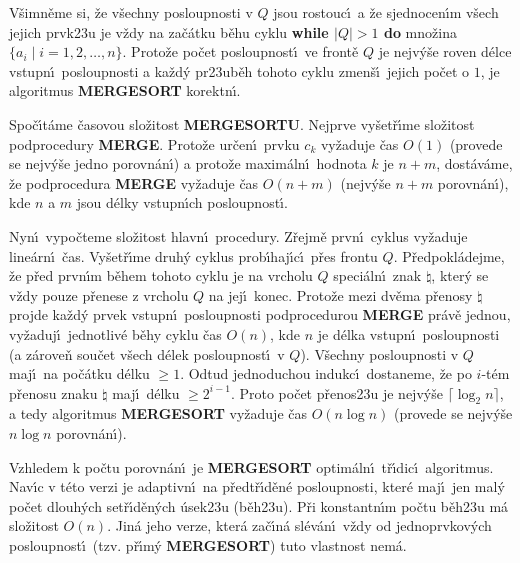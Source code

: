 \flushpar V\v simn\v eme si, \v ze v\v sechny posloupnosti v $Q$ jsou 
rostouc\'\i\ a \v ze sjednocen\'\i m v\v sech jejich prvk\accent23u  
je v\v zdy na za\v c\'atku b\v ehu cyklu {\bf while 
$|Q|>1$ do} mno\v zina $\{a_i\mid i=1,2,\dots,n\}$. 
Proto\v ze po\v cet 
posloupnost\'\i\ ve front\v e $Q$ je nejv\'y\v se roven d\'elce vstupn\'\i\ 
posloupnosti a ka\v zd\'y pr\accent23ub\v eh tohoto 
cyklu zmen\v s\'\i\ jejich po\v cet o $1$, je algoritmus {\bf MERGE\-SORT} korektn\'\i .
\medskip

\flushpar Spo\v c\'\i t\'ame \v casovou slo\v zitost {\bf MERGESORTU}. 
Nejprve vy\v set\v r\'\i me slo\-\v zi\-tost podprocedury {\bf MER\-GE}. Proto\v ze 
ur\v cen\'\i\ prvku $c_k$ vy\v za\-du\-je \v cas $O(1)$ (provede se 
nejv\'y\v se jedno porovn\'an\'\i ) a 
proto\v ze maxim\'aln\'\i\ hodnota $k$ je $n+m$, dost\'av\'ame, \v ze 
podprocedura {\bf MERGE} vy\v zaduje \v cas $O(n+m)$ (nejv\'y\v se $
n+m$ 
porovn\'an\'\i ), kde $n$ a $m$ jsou d\'elky vstupn\'\i ch posloupnost\'\i .
\medskip

\flushpar Nyn\'\i\ vypo\v cteme slo\v zitost hlavn\'\i\ procedury. 
Z\v rejm\v e prvn\'\i\ cyklus vy\v zaduje line\'arn\'\i\ \v cas. Vy\v set\v r\'\i me 
druh\'y cyklus prob\'\i haj\'\i c\'\i\ p\v res frontu $Q$. P\v redpokl\'adejme, \v ze p\v red prvn\'\i m b\v ehem 
tohoto cyklu je na vrcholu $Q$ speci\'aln\'\i\ znak $\natural$, kter\'y se v\v zdy 
pouze p\v renese z vrcholu $Q$ na jej\'\i\ konec. Proto\v ze mezi dv\v ema 
p\v renosy $\natural$ projde ka\v zd\'y prvek vstupn\'\i\ posloupnosti 
podprocedurou {\bf MERGE} pr\'av\v e jednou, vy\v zaduj\'\i\ jednotliv\'e b\v ehy cyklu 
\v cas $O(n)$, kde 
$n$ je d\'elka vstupn\'\i\ posloupnosti (a z\'arove\v n sou\v cet v\v sech d\'elek 
posloupnost\'\i\ v $Q$). V\v sech\-ny posloupnosti v $Q$ maj\'\i\  
na po\v c\'atku d\'elku $\ge 1$. Odtud jednoduchou indukc\'\i\ 
dostaneme, \v ze po $i$-t\'em p\v renosu znaku $\natural$ maj\'\i\ 
d\'elku $\ge 2^{i-1}$. Proto po\v cet p\v renos\accent23u je 
nejv\'y\v se $\lceil\log_2n\rceil$, a tedy algoritmus {\bf MERGESORT }
vy\v zaduje \v cas $O(n\log n)$ (provede se nejv\'y\v se $n\log n$ 
porovn\'an\'\i ).
\medskip

\flushpar Vzhledem k 
po\v ctu porovn\'an\'\i\ je {\bf MERGESORT} optim\'aln\'\i\ t\v r\'\i dic\'\i\ algoritmus. 
Nav\'\i c v t\'eto verzi je adaptivn\'\i\ na p\v redt\v r\'\i d\v en\'e 
posloupnosti, kter\'e maj\'\i\ jen mal\'y po\v cet dlouh\'ych 
set\v r\'\i d\v en\'ych \'usek\accent23u (b\v eh\accent23u). P\v ri 
konstantn\'\i m po\v ctu b\v eh\accent23u m\'a slo\v zitost $O(n)$. Jin\'a 
jeho verze, kter\'a za\v c\'\i n\'a sl\'ev\'an\'\i\ v\v zdy od 
jednoprvkov\'ych posloupnost\'\i\ (tzv. p\v r\'\i m\'y {\bf MERGESORT}) 
tuto vlastnost nem\'a. 
\bigskip

